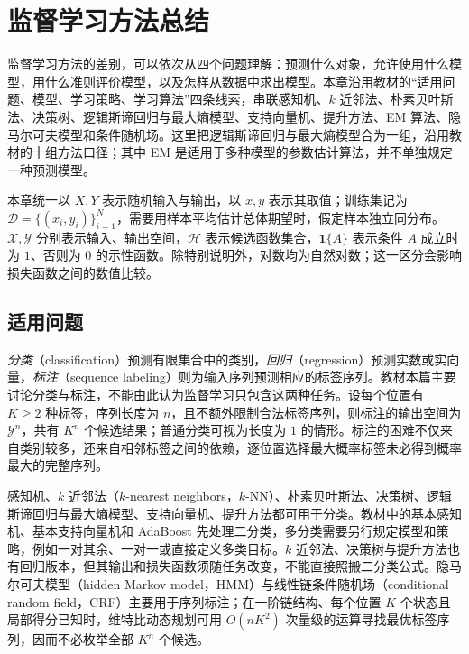 \setcounter{chapter}{11} %
\chapter{监督学习方法总结}
\label{ch:lh-supervised-summary}

监督学习方法的差别，可以依次从四个问题理解：预测什么对象，允许使用什么模型，用什么准则评价模型，以及怎样从数据中求出模型。本章沿用教材的“适用问题、模型、学习策略、学习算法”四条线索，串联感知机、$k$ 近邻法、朴素贝叶斯法、决策树、逻辑斯谛回归与最大熵模型、支持向量机、提升方法、EM 算法、隐马尔可夫模型和条件随机场。这里把逻辑斯谛回归与最大熵模型合为一组，沿用教材的十组方法口径；其中 EM 是适用于多种模型的参数估计算法，并不单独规定一种预测模型。

本章统一以 $X,Y$ 表示随机输入与输出，以 $x,y$ 表示其取值；训练集记为 $\mathcal D=\{(x_i,y_i)\}_{i=1}^N$，需要用样本平均估计总体期望时，假定样本独立同分布。$\mathcal X,\mathcal Y$ 分别表示输入、输出空间，$\mathcal H$ 表示候选函数集合，$\mathbf1\{A\}$ 表示条件 $A$ 成立时为 $1$、否则为 $0$ 的示性函数。除特别说明外，对数均为自然对数；这一区分会影响损失函数之间的数值比较。

\section{适用问题}
\label{sec:lh-summary-tasks}

\emph{分类}（classification）预测有限集合中的类别，\emph{回归}（regression）预测实数或实向量，\emph{标注}（sequence labeling）则为输入序列预测相应的标签序列。教材本篇主要讨论分类与标注，不能由此认为监督学习只包含这两种任务。设每个位置有 $K\geq2$ 种标签，序列长度为 $n$，且不额外限制合法标签序列，则标注的输出空间为 $\mathcal Y^n$，共有 $K^n$ 个候选结果；普通分类可视为长度为 $1$ 的情形。标注的困难不仅来自类别较多，还来自相邻标签之间的依赖，逐位置选择最大概率标签未必得到概率最大的完整序列。

感知机、$k$ 近邻法（$k$-nearest neighbors，$k$-NN）、朴素贝叶斯法、决策树、逻辑斯谛回归与最大熵模型、支持向量机、提升方法都可用于分类。教材中的基本感知机、基本支持向量机和 AdaBoost 先处理二分类，多分类需要另行规定模型和策略，例如一对其余、一对一或直接定义多类目标。$k$ 近邻法、决策树与提升方法也有回归版本，但其输出和损失函数须随任务改变，不能直接照搬二分类公式。隐马尔可夫模型（hidden Markov model，HMM）与线性链条件随机场（conditional random field，CRF）主要用于序列标注；在一阶链结构、每个位置 $K$ 个状态且局部得分已知时，维特比动态规划可用 $O(nK^2)$ 次量级的运算寻找最优标签序列，因而不必枚举全部 $K^n$ 个候选。

